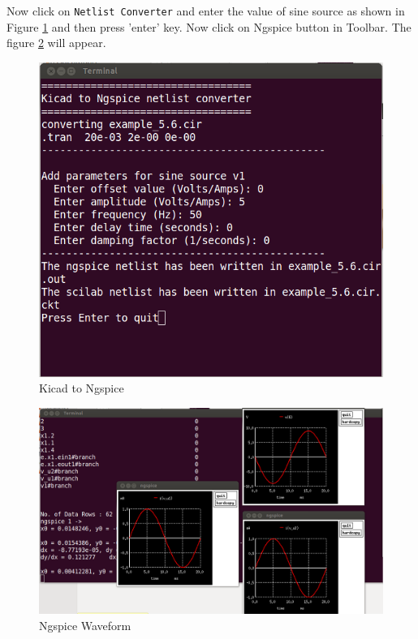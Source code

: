 \begin{enumerate}
Now click on {\tt Netlist Converter} and enter the value of sine source as shown in Figure \ref{31} and then press 'enter' key. Now click on Ngspice button in Toolbar. The figure \ref{32} will appear.
\begin{figure}%
\begin{center}
\includegraphics[width=1\linewidth]{figures/apd31.png}%
\caption{Kicad to Ngspice}
\label{31}
\end{center}
\end{figure}
\begin{figure}%
\begin{center}
\includegraphics[width=1\linewidth]{figures/apd32.png}%
\caption{Ngspice Waveform}
\label{32}
\end{center}
\end{figure}


\end{enumerate}
